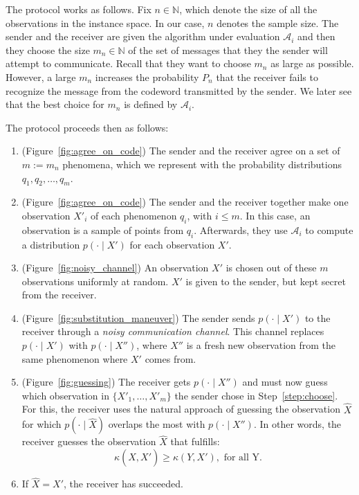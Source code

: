 The protocol works as follows. Fix $n \in \mathbb{N}$, which denote the size of all the observations in the instance space. In our case, $n$ denotes the sample size. The sender and the receiver are given the algorithm under evaluation $\mathcal{A}_i$ and then they choose the size $m_n \in \mathbb{N}$ of the set of messages that they the sender will attempt to communicate. Recall that they want to choose $m_n$ as large as possible. However, a large $m_n$ increases the probability $P_n$ that the receiver fails to recognize the message from the codeword transmitted by the sender. We later see that the best choice for $m_n$ is defined by $\mathcal{A}_i$. 

The protocol proceeds then as follows:

\begin{enumerate}
\item\label{step:sample_observations} (Figure~\ref{fig:agree_on_code}) The sender and the receiver agree on a set of $m := m_n$ phenomena, which we represent with the probability distributions $q_1, q_2, \ldots, q_m$.
\item (Figure~\ref{fig:agree_on_code}) The sender and the receiver together make one observation $X'_i$ of each phenomenon $q_i$, with $i \leq m$. In this case, an observation is a sample of points from $q_i$. Afterwards, they use $\mathcal{A}_i$ to compute a distribution $p(\cdot \mid X')$ for each observation $X'$.
\item\label{step:choose} (Figure~\ref{fig:noisy_channel}) An observation $X'$ is chosen out of these $m$ observations uniformly at random. $X'$ is given to the sender, but kept secret from the receiver.
\item (Figure~\ref{fig:substitution_maneuver}) The sender sends $p(\cdot \mid X')$ to the receiver through a \emph{noisy communication channel}. This channel replaces $p(\cdot \mid X')$ with $p(\cdot \mid X'')$, where $X''$ is a fresh new observation from the same phenomenon where $X'$ comes from.
\item (Figure~\ref{fig:guessing}) The receiver gets $p(\cdot \mid X'')$ and must now guess which observation in $\{X'_1, \ldots, X'_m\}$ the sender chose in Step~\ref{step:choose}. For this, the receiver uses the natural approach of guessing the observation $\hat{X}$ for which $p(\cdot \mid \hat{X})$ overlaps the most with $p(\cdot \mid X'')$. In other words, the receiver guesses the observation $\hat{X}$ that fulfills:
%
$$\kappa\left(\hat{X}, X'\right) \geq \kappa\left(Y, X'\right), \text{ for all Y.}$$
%
\item If $\hat{X} = X'$, the receiver has succeeded.
\end{enumerate}

